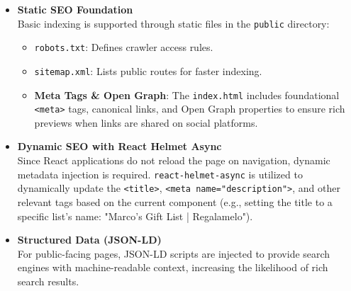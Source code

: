 \begin{itemize}
    \item \textbf{Static SEO Foundation} \\
        Basic indexing is supported through static files in the \texttt{public} directory:
        \begin{itemize}
            \item \texttt{robots.txt}: Defines crawler access rules.
            \item \texttt{sitemap.xml}: Lists public routes for faster indexing.
            \item \textbf{Meta Tags \& Open Graph}: The \texttt{index.html} includes foundational \texttt{<meta>} tags, canonical links, and Open Graph properties to ensure rich previews when links are shared on social platforms.
        \end{itemize}
    \item \textbf{Dynamic SEO with React Helmet Async} \\
        Since React applications do not reload the page on navigation, dynamic metadata injection is required. \texttt{react-helmet-async} is utilized to dynamically update the \texttt{<title>}, \texttt{<meta name="description">}, and other relevant tags based on the current component (e.g., setting the title to a specific list's name: "Marco's Gift List | Regalamelo").
    \item \textbf{Structured Data (JSON-LD)} \\
        For public-facing pages, JSON-LD scripts are injected to provide search engines with machine-readable context, increasing the likelihood of rich search results.
\end{itemize}
